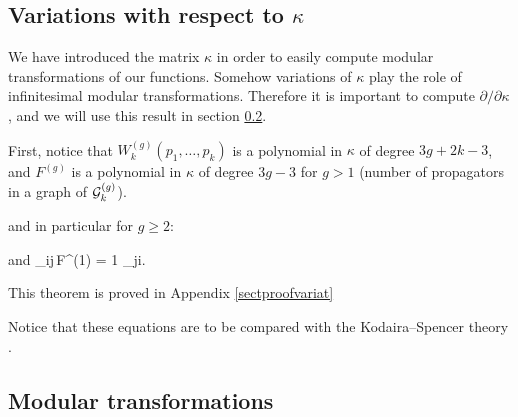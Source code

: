 \subsection{Variations with respect to  \texorpdfstring{$\kappa$}{k}}\label{sectvarikappa}

We have introduced the matrix $\kappa$ in order to easily compute modular transformations of our functions. Somehow variations of $\kappa$ play the role of infinitesimal modular transformations.
Therefore it is important to compute ${\partial/\partial \kappa}$, and we will use this result in section \ref{sectmodular}.

First, notice that $W^{(g)}_k(p_1,\dots,p_k)$ is a polynomial in $\kappa$ of degree $3g+2k-3$, and $F^{(g)}$ is a polynomial in $\kappa$ of degree $3g-3$ for $g>1$ (number of propagators in a graph of ${\cal G}_k^{(g)}$).

\bt\label{thdWdkappa}
\beq{}\eeq
and in particular for $g \geq 2$:
\beq{}\eeq

and
\beq
 {\partial \over \partial \kappa_{ij}}\,F^{(1)} =  {1 \over \kappa_{ji}}.
\eeq


\et
This theorem is proved in Appendix \ref{sectproofvariat}


Notice that these equations are to be compared with the Kodaira--Spencer theory \cite{ABK,ADKMV,BCOV, EMO}.






\subsection{Modular transformations} \label{sectmodular}


